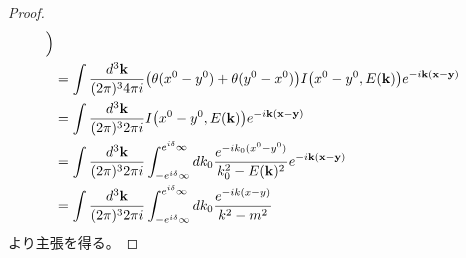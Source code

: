 \begin{proof}
\begin{align*}
    \Bigr) \\ &=
    \int \frac{d^3\mathbf{k}}{(2\pi)^3 4\pi i}
    \bigl(\theta(x^0-y^0)+\theta(y^0-x^0)\bigr)
    I\bigl(x^0-y^0,E(\mathbf{k})\bigr)
    e^{-i\mathbf{k}(\mathbf{x}-\mathbf{y})} \\ &=
    \int \frac{d^3\mathbf{k}}{(2\pi)^3 2\pi i}
    I\bigl(x^0-y^0,E(\mathbf{k})\bigr)
    e^{-i\mathbf{k}(\mathbf{x}-\mathbf{y})} \\ &=
    \int \frac{d^3\mathbf{k}}{(2\pi)^3 2\pi i}
    \int_{-e^{i\delta}\infty}^{e^{i\delta}\infty}
    dk_0
    \frac{e^{-ik_0(x^0-y^0)}}{k_0^2-E(\mathbf{k})^2}
    e^{-i\mathbf{k}(\mathbf{x}-\mathbf{y})} \\ &=
    \int \frac{d^3\mathbf{k}}{(2\pi)^3 2\pi i}
    \int_{-e^{i\delta}\infty}^{e^{i\delta}\infty}
    dk_0
    \frac{e^{-ik(x-y)}}{k^2-m^2}
  \end{align*}
  より主張を得る。
\end{proof}
